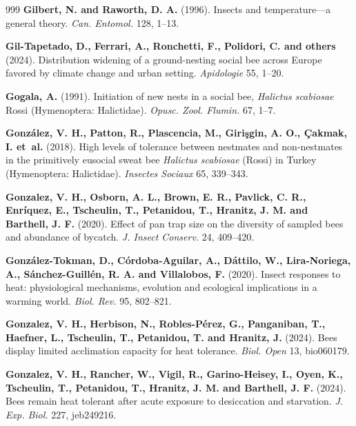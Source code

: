 \documentclass[11pt,a4paper]{article}
\begin{document}
\begin{thebibliography}{999}
\textbf{Gilbert, N. and Raworth, D. A.} (1996). Insects and temperature—a general theory. \textit{Can. Entomol.} 128, 1--13.

\textbf{Gil-Tapetado, D., Ferrari, A., Ronchetti, F., Polidori, C. and others} (2024).
Distribution widening of a ground-nesting social bee across Europe favored by climate change and urban setting.
\textit{Apidologie} 55, 1--20.

\textbf{Gogala, A.} (1991).
Initiation of new nests in a social bee, \textit{Halictus scabiosae} Rossi (Hymenoptera: Halictidae).
\textit{Opusc. Zool. Flumin.} 67, 1--7.

\textbf{González, V. H., Patton, R., Plascencia, M., Girişgin, A. O., Çakmak, I. et~al.} (2018).
High levels of tolerance between nestmates and non-nestmates in the primitively eusocial sweat bee \textit{Halictus scabiosae} (Rossi) in Turkey (Hymenoptera: Halictidae).
\textit{Insectes Sociaux} 65, 339--343.

\textbf{Gonzalez, V. H., Osborn, A. L., Brown, E. R., Pavlick, C. R., Enríquez, E., Tscheulin, T., Petanidou, T., Hranitz, J. M. and Barthell, J. F.} (2020). Effect of pan trap size on the diversity of sampled bees and abundance of bycatch. \textit{J. Insect Conserv.} 24, 409--420.

\textbf{Gonz\'{a}lez-Tokman, D., C\'{o}rdoba-Aguilar, A., D\'{a}ttilo, W., Lira-Noriega, A., S\'{a}nchez-Guill\'{e}n, R. A. and Villalobos, F.} (2020).
Insect responses to heat: physiological mechanisms, evolution and ecological implications in a warming world.
\textit{Biol. Rev.} 95, 802--821.

\textbf{Gonzalez, V. H., Herbison, N., Robles-Pérez, G., Panganiban, T., Haefner, L., Tscheulin, T., Petanidou, T. and Hranitz, J.} (2024). Bees display limited acclimation capacity for heat tolerance. \textit{Biol. Open} 13, bio060179.

\textbf{Gonzalez, V. H., Rancher, W., Vigil, R., Garino-Heisey, I., Oyen, K., Tscheulin, T., Petanidou, T., Hranitz, J. M. and Barthell, J. F.} (2024). Bees remain heat tolerant after acute exposure to desiccation and starvation. \textit{J. Exp. Biol.} 227, jeb249216.


\end{thebibliography}
\end{document}
